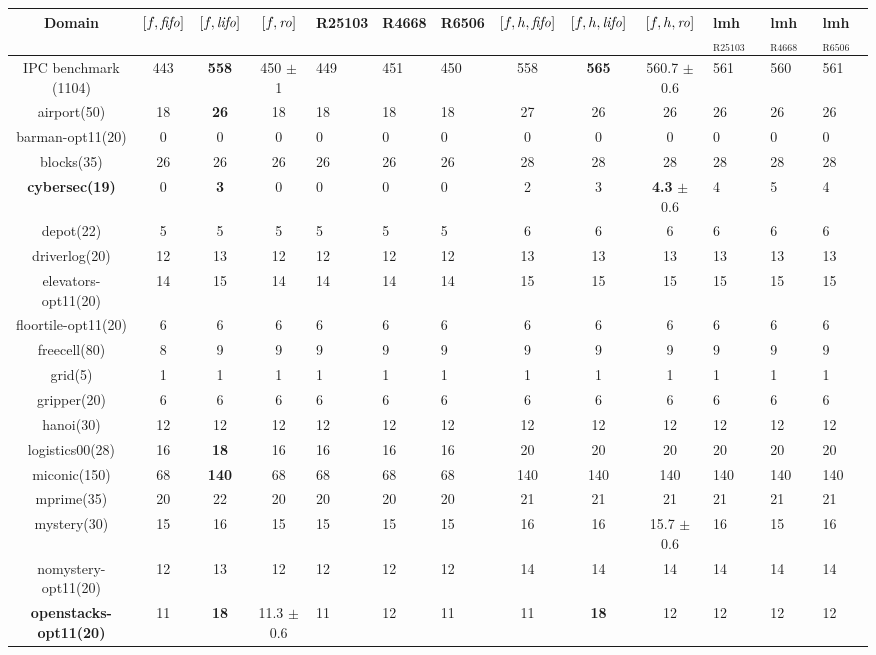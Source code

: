 \begin{center}
\begin{tabular}{|c|cccHHH|cccHHH|}
\hline
Domain & $[f,{\text{\textit{fifo}}}]$ & $[f,{\text{\textit{lifo}}}]$ & $[f,{\text{\textit{ro}}}]$ & R25103 & R4668 & R6506 & $[f,h,{\text{\textit{fifo}}}]$ & $[f,h,{\text{\textit{lifo}}}]$ & $[f,h,{\text{\textit{ro}}}]$ & lmh$_{\text{R25103}}$ & lmh$_{\text{R4668}}$ & lmh$_{\text{R6506}}$\\
\hline
IPC benchmark (1104) & 443 & \textbf{558} & 450 $\pm$ 1 & 449 & 451 & 450 & 558 & \textbf{565} & 560.7 $\pm$ 0.6 & 561 & 560 & 561\\
\hline
airport(50) & 18 & \textbf{26} & 18 & 18 & 18 & 18 & 27 & 26 & 26 & 26 & 26 & 26\\
barman-opt11(20) & 0 & 0 & 0 & 0 & 0 & 0 & 0 & 0 & 0 & 0 & 0 & 0\\
blocks(35) & 26 & 26 & 26 & 26 & 26 & 26 & 28 & 28 & 28 & 28 & 28 & 28\\
\textbf{cybersec(19)} & 0 & \textbf{3} & 0 & 0 & 0 & 0 & 2 & 3 & \textbf{4.3} $\pm$ 0.6 & 4 & 5 & 4\\
depot(22) & 5 & 5 & 5 & 5 & 5 & 5 & 6 & 6 & 6 & 6 & 6 & 6\\
driverlog(20) & 12 & 13 & 12 & 12 & 12 & 12 & 13 & 13 & 13 & 13 & 13 & 13\\
elevators-opt11(20) & 14 & 15 & 14 & 14 & 14 & 14 & 15 & 15 & 15 & 15 & 15 & 15\\
floortile-opt11(20) & 6 & 6 & 6 & 6 & 6 & 6 & 6 & 6 & 6 & 6 & 6 & 6\\
freecell(80) & 8 & 9 & 9 & 9 & 9 & 9 & 9 & 9 & 9 & 9 & 9 & 9\\
grid(5) & 1 & 1 & 1 & 1 & 1 & 1 & 1 & 1 & 1 & 1 & 1 & 1\\
gripper(20) & 6 & 6 & 6 & 6 & 6 & 6 & 6 & 6 & 6 & 6 & 6 & 6\\
hanoi(30) & 12 & 12 & 12 & 12 & 12 & 12 & 12 & 12 & 12 & 12 & 12 & 12\\
logistics00(28) & 16 & \textbf{18} & 16 & 16 & 16 & 16 & 20 & 20 & 20 & 20 & 20 & 20\\
miconic(150) & 68 & \textbf{140} & 68 & 68 & 68 & 68 & 140 & 140 & 140 & 140 & 140 & 140\\
mprime(35) & 20 & 22 & 20 & 20 & 20 & 20 & 21 & 21 & 21 & 21 & 21 & 21\\
mystery(30) & 15 & 16 & 15 & 15 & 15 & 15 & 16 & 16 & 15.7 $\pm$ 0.6 & 16 & 15 & 16\\
nomystery-opt11(20) & 12 & 13 & 12 & 12 & 12 & 12 & 14 & 14 & 14 & 14 & 14 & 14\\
\textbf{openstacks-opt11(20)} & 11 & \textbf{18} & 11.3 $\pm$ 0.6 & 11 & 12 & 11 & 11 & \textbf{18} & 12 & 12 & 12 & 12\\

\end{tabular}
\end{center}
